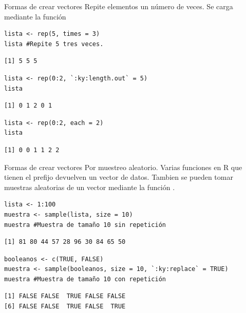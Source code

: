 \documentclass[8pt]{beamer}
\begin{document}
\begin{frame}[fragile]{Formas de crear vectores}
	Repite elementos un número de veces. Se carga mediante la función 
\begin{lstlisting}[style=RScript]
lista <- rep(5, times = 3)
lista #Repite 5 tres veces.
\end{lstlisting}
\begin{lstlisting}[style=RConsole]
[1] 5 5 5
\end{lstlisting}
\begin{lstlisting}[style=RScript]
lista <- rep(0:2, `:ky:length.out` = 5)
lista
\end{lstlisting}
\begin{lstlisting}[style=RConsole]
[1] 0 1 2 0 1
\end{lstlisting}
\begin{lstlisting}[style=RScript]
lista <- rep(0:2, each = 2)
lista
\end{lstlisting}
\begin{lstlisting}[style=RConsole]
[1] 0 0 1 1 2 2
\end{lstlisting}
\end{frame}



\begin{frame}[fragile]{Formas de crear vectores}
		Por muestreo aleatorio. Varias funciones en R que tienen el prefijo  devuelven un vector de datos. Tambien se pueden tomar muestras aleatorias de un vector mediante la función .
\begin{lstlisting}[style=RScript]
lista <- 1:100
muestra <- sample(lista, size = 10)
muestra #Muestra de tamaño 10 sin repetición
\end{lstlisting}
\begin{lstlisting}[style=RConsole]
[1] 81 80 44 57 28 96 30 84 65 50
\end{lstlisting}
\begin{lstlisting}[style=RScript]
booleanos <- c(TRUE, FALSE)
muestra <- sample(booleanos, size = 10, `:ky:replace` = TRUE)
muestra #Muestra de tamaño 10 con repetición
\end{lstlisting}
\begin{lstlisting}[style=RConsole]
[1] FALSE FALSE  TRUE FALSE FALSE
[6] FALSE FALSE  TRUE FALSE  TRUE
\end{lstlisting}
\end{frame}
\end{document}
